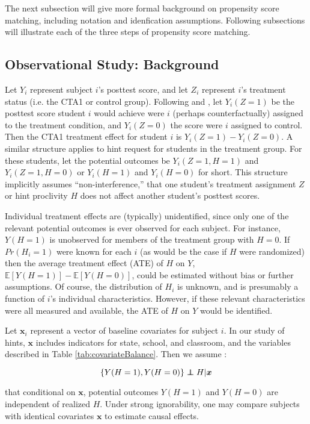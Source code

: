 \documentclass{article}\usepackage[]{graphicx}\usepackage[]{color}
\newcommand{\EE}{\mathbb{E}}
\newenvironment{ass}[2][Assumption:]{\begin{trivlist}
\item[\hskip \labelsep {\bfseries #1}\hskip \labelsep {\bfseries #2}.]}{\end{trivlist}}
\def\independenT#1#2{\mathrel{\rlap{$#1#2$}\mkern2mu{#1#2}}}
\newcommand\independent{\protect\mathpalette{\protect\independenT}{\perp}}
\begin{document}
The next subsection will give more formal background on propensity score matching, including notation and idenfication assumptions. Following subsections will illustrate each of the three steps of propensity score matching.

\subsection{Observational Study: Background}
Let $Y_i$ represent subject $i$'s posttest score, and let $Z_i$ represent
$i$'s treatment status (i.e. the CTA1 or control group).
Following \citet{neyman} and \citet{rubin}, let $Y_i(Z=1)$ be
the posttest score student $i$ would achieve were $i$ (perhaps
counterfactually) assigned to the treatment condition, and
$Y_i(Z=0)$ the score were $i$ assigned to control.
Then the CTA1 treatment effect for student $i$ is $Y_i(Z=1)-Y_i(Z=0)$.
A similar structure applies to hint request for students in the
treatment group.
For these students, let the potential outcomes be $Y_i(Z=1,H=1)$ and
$Y_i(Z=1,H=0)$ or $Y_i(H=1)$ and $Y_i(H=0)$ for short.
This structure implicitly assumes ``non-interference,'' that one
student's treatment assignment $Z$ or hint proclivity $H$ does not
affect another student's posttest scores.

Individual treatment effects are (typically) unidentified, since only
one of the relevant potential outcomes is ever observed for each
subject.
For instance, $Y(H=1)$ is unobserved for members of the
treatment group with $H=0$.
If $Pr(H_i=1)$ were known for each $i$ (as would be the case if $H$
were randomized) then the average treatment effect (ATE) of $H$ on $Y$,
$\EE[Y(H=1)]-\EE[Y(H=0)]$, could be estimated without bias or further
assumptions.
Of course, the distribution of $H_i$ is unknown, and is presumably a
function of $i$'s individual characteristics.
However, if these relevant characteristics were all measured and
available, the ATE of $H$ on $Y$ would be identified.

Let $\bm{x}_i$ represent a vector of baseline covariates for subject $i$.
In our study of hints, $\bm{x}$ includes indicators for state, school,
and classroom, and the variables described in Table \ref{tab:covariateBalance}.
Then we assume \citep[c.f.][]{rosenbaum1983central}:
\begin{ass}{Strong Ignorability}
\begin{equation*}
 \{Y(H=1),Y(H=0)\}\independent H |\bm{x}
\end{equation*}
\end{ass}
that conditional on $\bm{x}$, potential outcomes $Y(H=1)$ and $Y(H=0)$
are independent of realized $H$.
Under strong ignorability, one may compare subjects with identical
covariates $\bm{x}$ to estimate causal effects.
\end{document}
